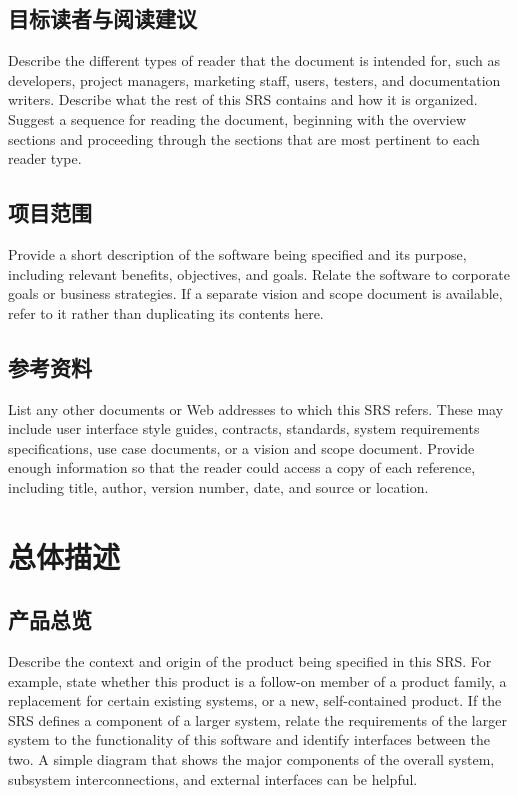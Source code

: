 \documentclass{ctexart}
\begin{document}
\subsection{目标读者与阅读建议}
Describe the different types of reader that the document is intended for, 
such as developers, project managers, marketing staff, users, testers, and 
documentation writers. Describe what the rest of this SRS contains and how it is 
organized. Suggest a sequence for reading the document, beginning with the 
overview sections and proceeding through the sections that are most pertinent to 
each reader type.


\subsection{项目范围}
Provide a short description of the software being specified and its purpose, 
including relevant benefits, objectives, and goals. Relate the software to 
corporate goals or business strategies. If a separate vision and scope document 
is available, refer to it rather than duplicating its contents here.


\subsection{参考资料}
List any other documents or Web addresses to which this SRS refers. These may 
include user interface style guides, contracts, standards, system requirements 
specifications, use case documents, or a vision and scope document. Provide 
enough information so that the reader could access a copy of each reference, 
including title, author, version number, date, and source or location.



\section{总体描述}
\subsection{产品总览}
Describe the context and origin of the product being specified in this SRS.  
For example, state whether this product is a follow-on member of a product 
family, a replacement for certain existing systems, or a new, self-contained 
product. If the SRS defines a component of a larger system, relate the 
requirements of the larger system to the functionality of this software and 
identify interfaces between the two. A simple diagram that shows the major 
components of the overall system, subsystem interconnections, and external 
interfaces can be helpful.
\end{document}
